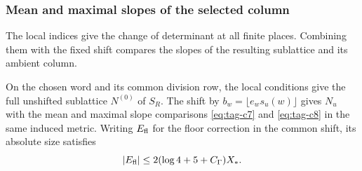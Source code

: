 \subsubsection{Mean and maximal slopes of the selected column}

The local indices give the change of determinant at all finite places. Combining them with the fixed shift compares the slopes of the resulting sublattice and its ambient column.

\begin{proposition}\label{prop:shifted-column-slopes}
On the chosen word and its common division row, the local
conditions give the full unshifted sublattice \(N^{(0)}\) of
\(S_R\). The shift by \(b_w=\lfloor e_ws_u(w)\rfloor\) gives
\(N_u\) with the mean and maximal slope comparisons
\textup{\eqref{eq:tag-c7}} and \textup{\eqref{eq:tag-c8}} in the same induced metric.
Writing \(E_{\rm fl}\) for the floor correction in the common shift, its absolute size satisfies
\[
 |E_{\rm fl}|\le2(\log4+5+C_\Gamma)X_*.
\]

\end{proposition}

